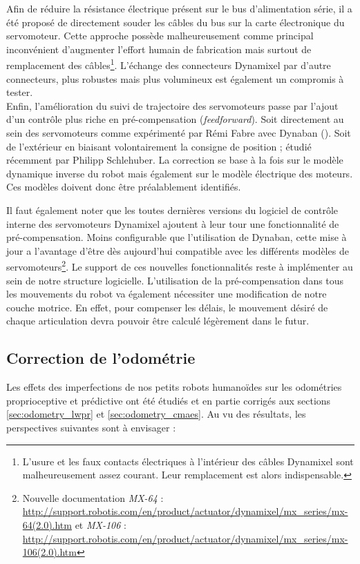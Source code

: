Afin de réduire la résistance électrique présent sur le bus
d'alimentation série, il a été proposé de
directement souder les câbles du bus sur la carte électronique du servomoteur.
Cette approche possède malheureusement comme principal inconvénient 
d'augmenter l'effort humain de fabrication mais surtout de remplacement
des câbles\footnote{L'usure et les faux contacts électriques à l'intérieur
des câbles Dynamixel sont malheureusement assez courant. 
Leur remplacement est alors indispensable.}.
L'échange des connecteurs Dynamixel par d'autre connecteurs, 
plus robustes mais plus volumineux est également un compromis à tester.\\

Enfin, l'amélioration du suivi de trajectoire des servomoteurs
passe par l'ajout d'un contrôle plus riche en pré-compensation (\textit{feedforward}).
Soit directement au sein des servomoteurs comme expérimenté par Rémi Fabre
avec Dynaban (\cite{DynabanRoboCup2016}).
Soit de l'extérieur en biaisant volontairement la consigne de position ;
étudié récemment par Philipp Schlehuber.
La correction se base à la fois sur le modèle dynamique inverse du robot
mais également sur le modèle électrique des moteurs.
Ces modèles doivent donc être préalablement identifiés.

Il faut également noter que les toutes dernières versions du logiciel
de contrôle interne des servomoteurs Dynamixel ajoutent à leur tour une fonctionnalité
de pré-compensation.
Moins \og configurable \fg que l'utilisation de Dynaban, cette mise à jour
a l'avantage d'être dès aujourd'hui compatible avec les différents modèles
de servomoteurs\footnote{Nouvelle documentation 
\textit{MX-64} : 
\url{http://support.robotis.com/en/product/actuator/dynamixel/mx_series/mx-64(2.0).htm} 
et \textit{MX-106} : 
\url{http://support.robotis.com/en/product/actuator/dynamixel/mx_series/mx-106(2.0).htm}}.
Le support de ces nouvelles fonctionnalités reste à implémenter au sein de notre
structure logicielle.
L'utilisation de la pré-compensation dans tous les mouvements du robot 
va également nécessiter une modification de notre couche motrice.
En effet, pour compenser les délais, le mouvement désiré de chaque articulation
devra pouvoir être calculé légèrement dans le futur.

\subsection{Correction de l'odométrie}

Les effets des imperfections de nos petits robots humanoïdes
sur les odométries proprioceptive et prédictive
ont été étudiés et en partie corrigés aux sections 
\ref{sec:odometry_lwpr} et \ref{sec:odometry_cmaes}.
Au vu des résultats, les perspectives suivantes sont à envisager :\\

